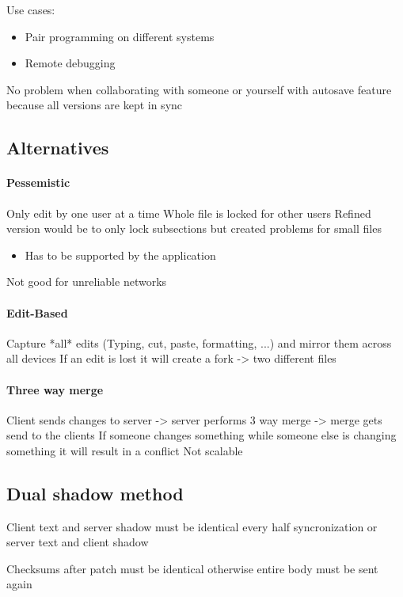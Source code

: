 Use cases:
\begin{itemize}
\item Pair programming on different systems
\item Remote debugging 
\end{itemize}

No problem when collaborating with someone or yourself with autosave feature because all versions are kept in sync

\subsection{Alternatives}

\paragraph{Pessemistic}
Only edit by one user at a time
Whole file is locked for other users
Refined version would be to only lock subsections but created problems for small files
\begin{itemize}
    \item Has to be supported by the application
\end{itemize}
Not good for unreliable networks

\paragraph{Edit-Based}
Capture *all* edits (Typing, cut, paste, formatting, ...) and mirror them across all devices
If an edit is lost it will create a fork -> two different files

\paragraph{Three way merge}

Client sends changes to server -> server performs 3 way merge -> merge gets send to the clients
If someone changes something while someone else is changing something it will result in a conflict
Not scalable

\subsection{Dual shadow method}

Client text and server shadow must be identical every half syncronization or server text and client shadow

Checksums after patch must be identical otherwise entire body must be sent again

